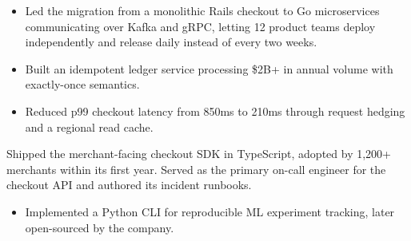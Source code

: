 \begin{cvgroup}[rule]
  \begin{itemize}
    \item Led the migration from a monolithic Rails checkout to Go microservices communicating over Kafka and gRPC, letting 12 product teams deploy independently and release daily instead of every two weeks.
    \item Built an idempotent ledger service processing \$2B+ in annual volume with exactly-once semantics.
    \item Reduced p99 checkout latency from 850\:ms to 210\:ms through request hedging and a regional read cache.
  \end{itemize}

  \smallskip

  Shipped the merchant-facing checkout SDK in TypeScript, adopted by 1,200+ merchants within its first year. Served as the primary on-call engineer for the checkout API and authored its incident runbooks.

  \smallskip
\end{cvgroup}

\begin{itemize}
  \item Implemented a Python CLI for reproducible ML experiment tracking, later open-sourced by the company.
\end{itemize}


